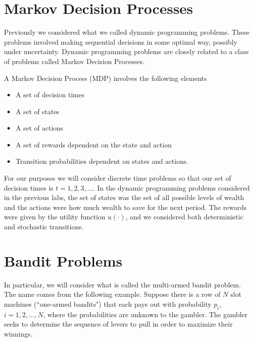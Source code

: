 
\section*{Markov Decision Processes}
Previously we considered what we called dynamic programming problems.  
These problems involved making sequential decisions in some optimal way, 
possibly under uncertainty.  Dynamic programming problems are closely 
related to a class of problems called Markov Decision Processes.

A Markov Decision Process (MDP) involves the following elements

\begin{itemize}
\item   A set of decision times
\item   A set of states
\item   A set of actions
\item   A set of rewards dependent on the state and action
\item   Transition probabilities dependent on states and actions.
\end{itemize}
For our purposes we will consider discrete time problems so that our 
set of decision times is $t = 1,2,3,\ldots$.  
In the dynamic programming problems considered in the previous labs, 
the set of states was the set of all possible levels of wealth and 
the actions were how much wealth to save for the next period.  
The rewards were given by the utility function $u(\cdot)$, 
and we considered both deterministic and stochastic transitions.

\section*{Bandit Problems}
In particular, we will consider what is called the multi-armed bandit 
problem.  The name comes from the following example.  
Suppose there is a row of $N$ slot machines (``one-armed bandits") 
that each pays out with probability $p_i$, $i= 1,2,\ldots,N$, 
where the probabilities are unknown to the gambler.  
The gambler seeks to determine the sequence of levers to pull in 
order to maximize their winnings.

